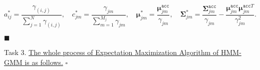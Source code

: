 \documentclass{article}
\renewcommand{\qedsymbol}{\hfill $\blacksquare$\par}
\newcommand{\whiteqed}{\hfill $\square$\par}
\begin{document}
     $$a_{ij}^*=\frac{\gamma_{(i,j)}}{\sum_{j=1}^N\gamma_{(i,j)}}, \quad
     c_{jm}^* =\frac{\gamma_{jm}}{\sum_{m=1}^{M_j}\gamma_{jm}},\quad \boldsymbol{\mu}_{jm}^*=\frac{\boldsymbol{\mu}_{jm}^{\mathtt{acc}}}{\gamma_{jm}}, \quad
     \boldsymbol{\Sigma}_{jm}^*=\frac{\boldsymbol{\Sigma}_{jm}^{\mathtt{acc}}}{\gamma_{jm}} - \frac{\boldsymbol{\mu}_{jm}^{\mathtt{acc}}\boldsymbol{\mu}_{jm}^{\mathtt{acc}T}}{\gamma_{jm}^2}.\qquad\qquad$$
     
     \vspace{-2.85em}\qedsymbol
     
     \vspace{5em} \hspace{-4.5em} Task 3.\quad
     \underline{The whole process of Expectation Maximization Algorithm of HMM-GMM is as follows.} \whiteqed
     
\end{document}
